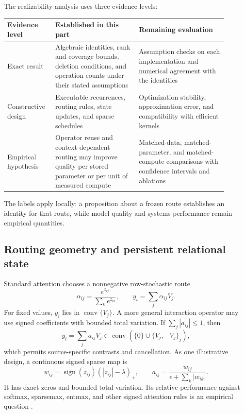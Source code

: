 \documentclass[10pt]{article}
\theoremstyle{definition}
\theoremstyle{remark}
\newcommand{\BookSection}[1]{\subsection{#1}}
\begin{document}
The realizability analysis uses three evidence levels:
\begin{center}
\small
\begin{tabular}{@{}>{\raggedright\arraybackslash}p{0.18\linewidth}
                >{\raggedright\arraybackslash}p{0.35\linewidth}
                >{\raggedright\arraybackslash}p{0.37\linewidth}@{}}
\toprule
Evidence level & Established in this part & Remaining evaluation \\
\midrule
Exact result & Algebraic identities, rank and coverage bounds, deletion conditions, and operation
counts under their stated assumptions & Assumption checks on each implementation and numerical
agreement with the identities \\
Constructive design & Executable recurrences, routing rules, state updates, and sparse schedules &
Optimization stability, approximation error, and compatibility with efficient kernels \\
Empirical hypothesis & Operator reuse and context-dependent routing may improve quality per stored
parameter or per unit of measured compute & Matched-data, matched-parameter, and matched-compute
comparisons with confidence intervals and ablations \\
\bottomrule
\end{tabular}
\end{center}
The labels apply locally: a proposition about a frozen route establishes an identity for that
route, while model quality and systems performance remain empirical quantities.

\BookSection{Routing geometry and persistent relational state}

Standard attention chooses a nonnegative row-stochastic route
\begin{equation}
\alpha_{ij}=\frac{e^{z_{ij}}}{\sum_k e^{z_{ik}}},
\qquad y_i=\sum_j\alpha_{ij}V_j.
\label{eq:simplex-routing}
\end{equation}
For fixed values, $y_i$ lies in $\operatorname{conv}\{V_j\}$.  A more general interaction operator
may use signed coefficients with bounded total variation.  If
$\sum_j|a_{ij}|\leq1$, then
\begin{equation}
y_i=\sum_ja_{ij}V_j
\in\operatorname{conv}(\{0\}\cup\{V_j,-V_j\}_j),
\label{eq:absolute-convex-routing}
\end{equation}
which permits source-specific contrasts and cancellation.  As one illustrative design, a
continuous signed sparse map is
\begin{equation}
w_{ij}=\operatorname{sign}(z_{ij})(|z_{ij}|-\lambda)_+,
\qquad
a_{ij}=\frac{w_{ij}}{\epsilon+\sum_k|w_{ik}|}.
\label{eq:signed-threshold-routing}
\end{equation}
It has exact zeros and bounded total variation.  Its relative performance against softmax,
sparsemax, entmax, and other signed attention rules is an empirical question
\cite{martins2016,peters2019,ye2024}.
\end{document}
